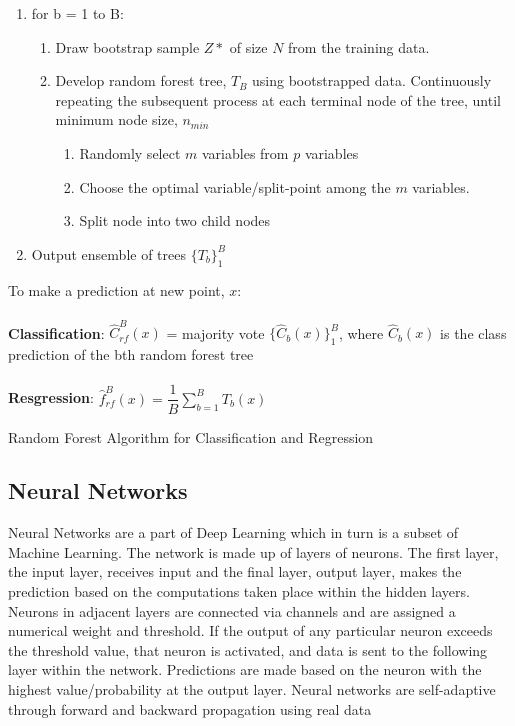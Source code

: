 \begin{algorithm}[H]
    \SetAlgoLined
    \begin{enumerate}
        \item for b = 1 to B:
        \bigskip
        \begin{enumerate}
            \item Draw bootstrap sample $Z*$ of size $N$ from the training data.
            \item Develop random forest tree, $T_B$ using bootstrapped data. Continuously repeating the subsequent process at each terminal node of the tree, 
            until minimum node size, $n_{min}$ 
            \bigskip
            \begin{enumerate}
                \item Randomly select $m$ variables from $p$ variables
                \item Choose the optimal variable/split-point among the $m$ variables.
                \item Split node into two child nodes
            \end{enumerate}
        \end{enumerate}
        \bigskip
        \item Output ensemble of trees $\{T_b\}^B_1$
    \end{enumerate}

    \bigskip
    To make a prediction at new point, $x$: \\
    \\
    \textbf{Classification}: $\hat{C}_{rf}^B(x)$ = majority vote $\{\hat{C}_b(x)\}^B_1$, where $\hat{C}_b(x)$ is the class prediction of the bth random forest tree\\
    \\\textbf{Resgression}:  $\hat{f}^B_{rf}(x) = \dfrac{1}{B} \sum^B_{b=1}T_b(x)$
    \caption{Random Forest Algorithm for Classification and Regression \cite{rf}}
\end{algorithm}

\subsection{Neural Networks}
Neural Networks are a part of Deep Learning which in turn is a subset of Machine Learning.
The network is made up of layers of neurons.
The first layer, the input layer, receives input and the final layer, output layer, makes the prediction based on the computations taken place within the hidden layers.
Neurons in adjacent layers are connected via channels and are assigned a numerical weight and threshold.
If the output of any particular neuron exceeds the threshold value, that neuron is activated, and data is sent to the following layer within the network.
Predictions are made based on the neuron with the highest value/probability at the output layer. 
Neural networks are self-adaptive through forward and backward propagation using real data

